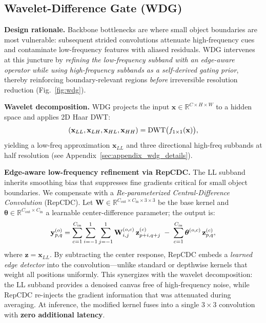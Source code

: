 \documentclass{article}
\theoremstyle{plain}
\theoremstyle{definition}
\theoremstyle{remark}
\begin{document}
\subsection{Wavelet-Difference Gate (WDG)}


\noindent\textbf{Design rationale.}  
Backbone bottlenecks are where small object boundaries are most vulnerable: subsequent strided convolutions attenuate high-frequency cues and contaminate low-frequency features with aliased residuals. WDG intervenes at this juncture by \emph{refining the low-frequency subband with an edge-aware operator while using high-frequency subbands as a self-derived gating prior}, thereby reinforcing boundary-relevant regions \emph{before} irreversible resolution reduction (Fig.~\ref{fig:wdg}).

\noindent\textbf{Wavelet decomposition.}  
WDG projects the input $\mathbf{x}\in\mathbb{R}^{C\times H\times W}$ to a hidden space and applies 2D Haar DWT:
\vspace{-0.2cm}
\begin{equation}
\label{eq:wdg_proj}
(\mathbf{x}_{LL},\mathbf{x}_{LH},\mathbf{x}_{HL},\mathbf{x}_{HH}) = \mathrm{DWT}\bigl(f_{1\times 1}(\mathbf{x})\bigr),
\vspace{-0.2cm}
\end{equation}
yielding a low-freq approximation $\mathbf{x}_{LL}$ and three directional high-freq subbands at half resolution (see Appendix~\ref{sec:appendix_wdg_details}).

\noindent\textbf{Edge-aware low-frequency refinement via RepCDC.}  
The LL subband inherits smoothing bias that suppresses fine gradients critical for small object boundaries. We compensate with a \emph{Re-parameterized Central-Difference Convolution} (RepCDC). Let $\mathbf{W}\in\mathbb{R}^{C_{\mathrm{out}}\times C_{\mathrm{in}}\times 3\times 3}$ be the base kernel and $\boldsymbol{\theta}\in\mathbb{R}^{C_{\mathrm{out}}\times C_{\mathrm{in}}}$ a learnable center-difference parameter; the output is:
\vspace{-0.2cm}
\begin{equation}
\label{eq:wdg_repcdc}
\mathbf{y}^{(o)}_{p,q} = \sum_{c=1}^{C_{\mathrm{in}}}\sum_{i=-1}^{1}\sum_{j=-1}^{1} \mathbf{W}^{(o,c)}_{i,j}\,\mathbf{z}^{(c)}_{p+i,q+j} \;-\; \sum_{c=1}^{C_{\mathrm{in}}} \boldsymbol{\theta}^{(o,c)}\,\mathbf{z}^{(c)}_{p,q},
\vspace{-0.2cm}
\end{equation}
where $\mathbf{z}=\mathbf{x}_{LL}$. By subtracting the center response, RepCDC embeds a \emph{learned edge detector} into the convolution---unlike standard or depthwise kernels that weight all positions uniformly. This synergizes with the wavelet decomposition: the LL subband provides a denoised canvas free of high-frequency noise, while RepCDC re-injects the gradient information that was attenuated during averaging. At inference, the modified kernel fuses into a single $3{\times}3$ convolution with \textbf{zero additional latency}.
\end{document}
